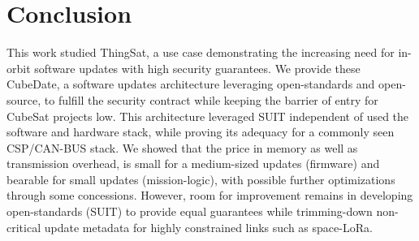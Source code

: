 \section{Conclusion}
\label{sec:conclusion}

This work studied ThingSat, a use case demonstrating the increasing need for in-orbit
software updates with high security guarantees. We provide these CubeDate, a
software updates architecture leveraging open-standards and open-source, to fulfill
the security contract while keeping the barrier of entry for CubeSat projects low.
This architecture leveraged SUIT independent of used the software and hardware stack,
while proving its adequacy for a commonly seen CSP/CAN-BUS stack. We showed that
the price in memory as well as transmission overhead, is small for a medium-sized
updates (firmware) and bearable for small updates (mission-logic), with possible
further optimizations through some concessions. However, room for improvement remains
in developing open-standards (SUIT) to provide equal guarantees while trimming-down
non-critical update metadata for highly constrained links such as space-LoRa.
